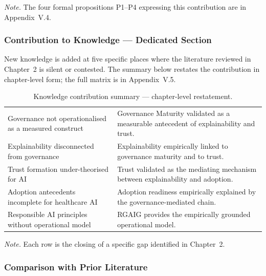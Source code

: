 \vspace{0.3em}\noindent\textit{Note.} The four formal propositions P1--P4 expressing this contribution are in Appendix~V.4.


\subsubsection{Contribution to Knowledge --- Dedicated Section}
\label{sec:ch5_knowledge_contribution_dedicated}

\noindent New knowledge is added at five specific places where the literature reviewed in Chapter~2 is silent or contested. The summary below restates the contribution in chapter-level form; the full matrix is in Appendix~V.5.

{\tablestripes\tablefontsize
{}
\begin{xltabular}{\textwidth}{@{} >{\raggedright\arraybackslash}p{5cm} L @{}}
\caption[Knowledge contribution summary --- chapter-level restatement]{Knowledge contribution summary --- chapter-level restatement.}\label{tab:ch5_knowledge_contribution_dedicated} \\
\toprule
{} &  \\
\midrule
\endfirsthead
\endhead
\bottomrule
\endlastfoot
Governance not operationalised as a measured construct & Governance Maturity validated as a measurable antecedent of explainability and trust. \\
\addlinespace
Explainability disconnected from governance & Explainability empirically linked to governance maturity and to trust. \\
\addlinespace
Trust formation under-theorised for AI & Trust validated as the mediating mechanism between explainability and adoption. \\
\addlinespace
Adoption antecedents incomplete for healthcare AI & Adoption readiness empirically explained by the governance-mediated chain. \\
\addlinespace
Responsible AI principles without operational model & RGAIG provides the empirically grounded operational model. \\
\end{xltabular}}

\vspace{0.3em}\noindent\textit{Note.} Each row is the closing of a specific gap identified in Chapter~2.


\subsubsection{Comparison with Prior Literature}
\label{sec:ch5_literature_comparison}

